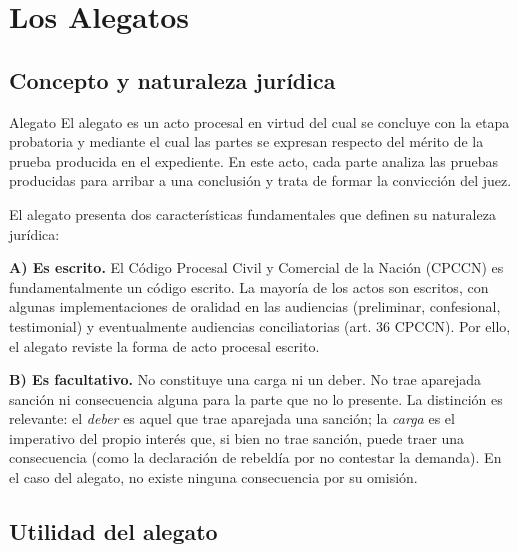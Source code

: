 \documentclass[12pt,oneside]{book}
\begin{document}
\tableofcontents
\newpage

\chapter{Los Alegatos}

\section{Concepto y naturaleza jurídica}

\begin{definition}{Alegato}
El alegato es un acto procesal en virtud del cual se concluye con la etapa probatoria y mediante el cual las partes se expresan respecto del mérito de la prueba producida en el expediente. En este acto, cada parte analiza las pruebas producidas para arribar a una conclusión y trata de formar la convicción del juez.
\end{definition}

El alegato presenta dos características fundamentales que definen su naturaleza jurídica:

\textbf{A) Es escrito.} El Código Procesal Civil y Comercial de la Nación (CPCCN) es fundamentalmente un código escrito. La mayoría de los actos son escritos, con algunas implementaciones de oralidad en las audiencias (preliminar, confesional, testimonial) y eventualmente audiencias conciliatorias (art. 36 CPCCN). Por ello, el alegato reviste la forma de acto procesal escrito.

\textbf{B) Es facultativo.} No constituye una carga ni un deber. No trae aparejada sanción ni consecuencia alguna para la parte que no lo presente. La distinción es relevante: el \textit{deber} es aquel que trae aparejada una sanción; la \textit{carga} es el imperativo del propio interés que, si bien no trae sanción, puede traer una consecuencia (como la declaración de rebeldía por no contestar la demanda). En el caso del alegato, no existe ninguna consecuencia por su omisión.

\section{Utilidad del alegato}
\end{document}
